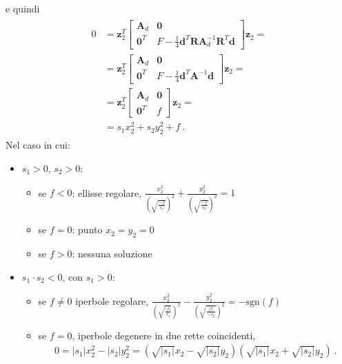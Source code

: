\documentclass[letterpaper,10pt,italian]{jupyterBook}
\begin{document}
\sphinxAtStartPar
e quindi
\begin{equation*}
\begin{split}\begin{aligned}
  0 
  & = \mathbf{z}_2^T \begin{bmatrix} \mathbf{A}_d & \mathbf{0} \\ \mathbf{0}^T & F - \frac{1}{4} \mathbf{d}^T \mathbf{R} \mathbf{A}_d^{-1} \mathbf{R}^T \mathbf{d} \end{bmatrix} \mathbf{z}_2 = \\
  & = \mathbf{z}_2^T \begin{bmatrix} \mathbf{A}_d & \mathbf{0} \\ \mathbf{0}^T & F - \frac{1}{4} \mathbf{d}^T \mathbf{A}^{-1} \mathbf{d} \end{bmatrix} \mathbf{z}_2 = \\
  & = \mathbf{z}_2^T \begin{bmatrix} \mathbf{A}_d & \mathbf{0} \\ \mathbf{0}^T & f \end{bmatrix} \mathbf{z}_2 = \\
  & = s_1 x_2^2 + s_2 y_2^2 + f \ .
\end{aligned}\end{split}
\end{equation*}
\sphinxAtStartPar
Nel caso in cui:
\begin{itemize}
\item {} 
\sphinxAtStartPar
\(s_1 > 0\), \(s_2 > 0\):
\begin{itemize}
\item {} 
\sphinxAtStartPar
se \(f < 0\): ellisse regolare, \(\frac{x_2^2}{\left( \sqrt{\frac{-f}{s_1}} \right)^2} + \frac{y_2^2}{\left( \sqrt{\frac{-f}{s_2}} \right)^2} = 1\)

\item {} 
\sphinxAtStartPar
se \(f = 0\): punto \(x_2 = y_2 = 0\)

\item {} 
\sphinxAtStartPar
se \(f > 0\): nessuna soluzione

\end{itemize}

\item {} 
\sphinxAtStartPar
\(s_1 \cdot s_2 < 0\), con \(s_1 > 0\):
\begin{itemize}
\item {} 
\sphinxAtStartPar
se \(f \ne 0\) iperbole regolare, \(\frac{x_2^2}{\left( \sqrt{\frac{|f|}{s_1}} \right)^2} - \frac{y_2^2}{\left( \sqrt{\frac{|f|}{-s_2}} \right)^2} = - \text{sgn}(f)\)

\item {} 
\sphinxAtStartPar
se \(f = 0\), iperbole degenere in due rette coincidenti,
\begin{equation*}
\begin{split}0 = |s_1| x_2^2 - |s_2| y_2^2 = \left( \sqrt{|s_1|} x_2 - \sqrt{|s_2|} y_2 \right)\left( \sqrt{|s_1|} x_2 + \sqrt{|s_2|} y_2 \right) \ .\end{split}
\end{equation*}
\end{itemize}

\end{itemize}
\end{document}
